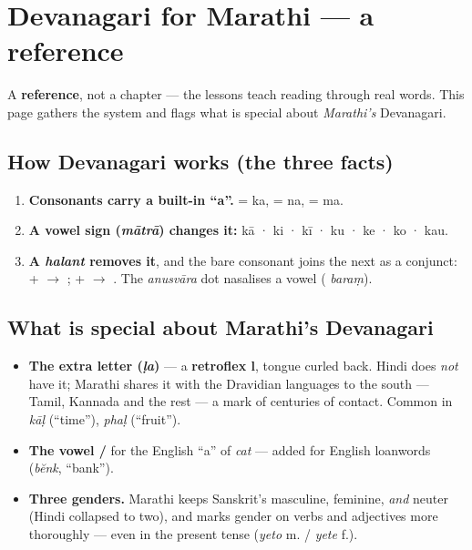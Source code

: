 
\chapter*{Devanagari for Marathi --- a reference}

A \textbf{reference}, not a chapter — the lessons teach reading through real words. This page gathers the system and flags what is special about \emph{Marathi's} Devanagari.

\section*{How Devanagari works (the three facts)}

\begin{enumerate}
\raggedright
\setlength{\itemsep}{0.35em}
  \item \textbf{Consonants carry a built-in \textquotedblleft{}a\textquotedblright{}.}  = ka,  = na,  = ma.
  \item \textbf{A vowel sign (\emph{mātrā}) changes it:}  kā ·  ki ·  kī ·  ku ·  ke ·  ko ·  kau.
  \item \textbf{A \emph{halant} removes it}, and the bare consonant joins the next as a conjunct:  +  $\to$ ;  +  $\to$ . The \emph{anusvāra} dot  nasalises a vowel ( \emph{baraṃ}).
\end{enumerate}

\section*{What is special about Marathi's Devanagari}

\begin{itemize}
\raggedright
\setlength{\itemsep}{0.35em}
  \item \textbf{The extra letter  (\emph{ḷa})} — a \textbf{retroflex l}, tongue curled back. Hindi does \emph{not} have it; Marathi shares it with the Dravidian languages to the south — Tamil, Kannada and the rest — a mark of centuries of contact. Common in \emph{kāḷ} (\textquotedblleft{}time\textquotedblright{}), \emph{phaḷ} (\textquotedblleft{}fruit\textquotedblright{}).
  \item \textbf{The vowel  / } for the English \textquotedblleft{}a\textquotedblright{} of \emph{cat} — added for English loanwords (\emph{bĕnk}, \textquotedblleft{}bank\textquotedblright{}).
  \item \textbf{Three genders.} Marathi keeps Sanskrit's masculine, feminine, \emph{and} neuter (Hindi collapsed to two), and marks gender on verbs and adjectives more thoroughly — even in the present tense (\emph{yeto} m. / \emph{yete} f.).
\end{itemize}

